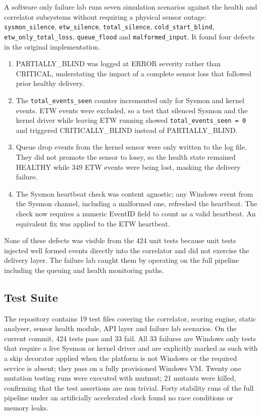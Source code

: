 \documentclass[10pt,twocolumn,letterpaper]{article}
\newcommand{\code}[1]{\texttt{\small #1}}
\begin{document}
A software only failure lab runs seven simulation scenarios against the health and
correlator subsystems without requiring a physical sensor outage:
\code{sysmon\_silence}, \code{etw\_silence}, \code{total\_silence},
\code{cold\_start\_blind}, \code{etw\_only\_total\_loss}, \code{queue\_flood} and
\code{malformed\_input}. It found four defects in the original implementation.

\begin{enumerate}[leftmargin=*]
  \item PARTIALLY\_BLIND was logged at ERROR severity rather than CRITICAL, understating
    the impact of a complete sensor loss that followed prior healthy delivery.
  \item The \code{total\_events\_seen} counter incremented only for Sysmon and kernel
    events. ETW events were excluded, so a test that silenced Sysmon and the kernel
    driver while leaving ETW running showed \code{total\_events\_seen~=~0} and triggered
    CRITICALLY\_BLIND instead of PARTIALLY\_BLIND.
  \item Queue drop events from the kernel sensor were only written to the log file. They
    did not promote the sensor to lossy, so the health state remained HEALTHY while 349
    ETW events were being lost, masking the delivery failure.
  \item The Sysmon heartbeat check was content agnostic; any Windows event from the
    Sysmon channel, including a malformed one, refreshed the heartbeat. The check now
    requires a numeric EventID field to count as a valid heartbeat. An equivalent fix
    was applied to the ETW heartbeat.
\end{enumerate}

None of these defects was visible from the 424 unit tests because unit tests injected
well formed events directly into the correlator and did not exercise the delivery
layer. The failure lab caught them by operating on the full pipeline including the
queuing and health monitoring paths.

\subsection{Test Suite}
\label{sec:tests}

The repository contains 19 test files covering the correlator, scoring engine, static
analyser, sensor health module, API layer and failure lab scenarios. On the current
commit, 424 tests pass and 33 fail. All 33 failures are Windows only tests that require
a live Sysmon or kernel driver and are explicitly marked as such with a skip decorator
applied when the platform is not Windows or the required service is absent; they pass on
a fully provisioned Windows VM. Twenty one mutation testing runs were executed with
mutmut; 21 mutants were killed, confirming that the test assertions are non trivial.
Forty stability runs of the full pipeline under an artificially accelerated clock found
no race conditions or memory leaks.
\end{document}
